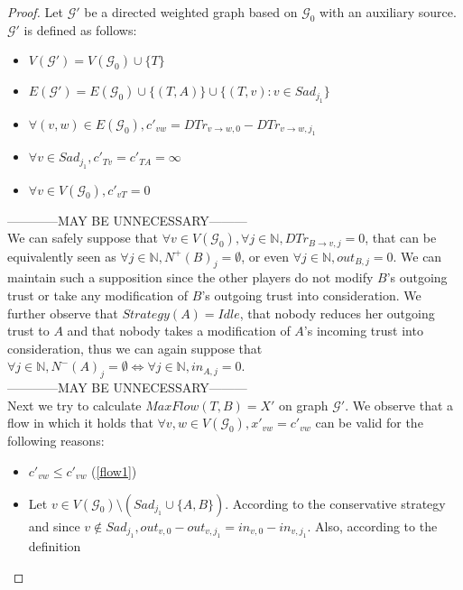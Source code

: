 \documentclass[11pt]{article}
\theoremstyle{definition}
\theoremstyle{corollary}
\theoremstyle{lemma}
\begin{document}
    \begin{proof}
       Let $\mathcal{G}'$ be a directed weighted graph based on $\mathcal{G}_0$ with an auxiliary source. $\mathcal{G}'$ is
       defined as follows:
       \begin{itemize}
          \item $V(\mathcal{G}') = V(\mathcal{G}_0) \cup \{T\}$
          \item $E(\mathcal{G}') = E(\mathcal{G}_0) \cup \{(T, A)\} \cup \{(T, v) : v \in Sad_{j_1}\}$
          \item $\forall (v, w) \in E(\mathcal{G}_0), c'_{vw} = DTr_{v \rightarrow w, 0} - DTr_{v \rightarrow w, j_1}$
          \item $\forall v \in Sad_{j_1}, c'_{Tv} = c'_{TA} = \infty$
          \item $\forall v \in V(\mathcal{G}_0), c'_{vT} = 0$
       \end{itemize}
------------MAY BE UNNECESSARY--------- \\
       We can safely suppose that $\forall v \in V(\mathcal{G}_0), \forall j \in \mathbb{N}, DTr_{B \rightarrow v, j} = 0$,
       that can be equivalently seen as $\forall j \in \mathbb{N}, N^{+}(B)_j = \emptyset$, or even $\forall j \in
       \mathbb{N}, out_{B, j} = 0$. We can maintain such a supposition since the other players do not modify $B$'s outgoing
       trust or take any modification of $B$'s outgoing trust into consideration. We further observe that $Strategy(A) =
       Idle$, that nobody reduces her outgoing trust to $A$ and that nobody takes a modification of $A$'s incoming trust into
       consideration, thus we can again suppose that $\forall j \in \mathbb{N}, N^{-}(A)_j = \emptyset \Leftrightarrow
       \forall j \in \mathbb{N}, in_{A, j} = 0$. \\
------------MAY BE UNNECESSARY--------- \\
       Next we try to calculate $MaxFlow(T, B) = X'$ on graph $\mathcal{G}'$. We observe that a flow in which it holds that
       $\forall v, w \in V(\mathcal{G}_0), x'_{vw} = c'_{vw}$ can be valid for the following reasons:
       \begin{itemize}
          \item $c'_{vw} \leq c'_{vw}$ (\ref{flow1})
          \item Let $v \in V(\mathcal{G}_0) \setminus (Sad_{j_1} \cup \{A, B\})$. According to the conservative strategy and
          since $v \notin Sad_{j_1}, out_{v, 0} - out_{v, j_1} = in_{v, 0} - in_{v, j_1}$. Also, according to the definition

\end{itemize}
\end{proof}
\end{document}
